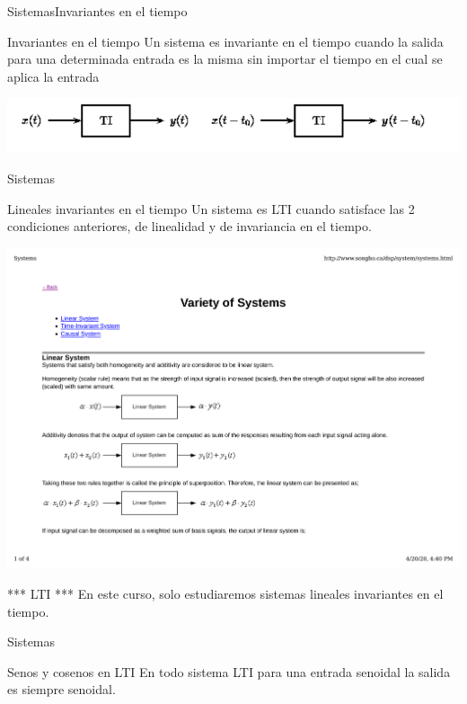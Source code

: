  \begin{frame}{Sistemas}{Invariantes en el tiempo}
    \begin{block}{Invariantes en el tiempo}
       Un sistema es invariante en el tiempo cuando la salida para una determinada entrada es la misma sin importar el tiempo en el cual se aplica la entrada
    \end{block}
    \center\includegraphics[width=1\textwidth]{1_clase/invariante_en_tiempo} \\
    \vfill
 \end{frame}
 \begin{frame}{Sistemas}{}
    \begin{block}{Lineales invariantes en el tiempo}
       Un sistema es LTI cuando satisface las 2 condiciones anteriores, de linealidad y de invariancia en el tiempo.
    \end{block}
    \center\includegraphics[width=1\textwidth]{1_clase/lti}
    \vfill
    \begin{alertblock}{*** LTI ***}
       En este curso, \alert{solo} estudiaremos sistemas lineales invariantes en el tiempo.
    \end{alertblock}
 \end{frame}
 \begin{frame}{Sistemas}{}
    \begin{block}{Senos y cosenos en LTI}
       En todo sistema LTI para una entrada senoidal la salida es siempre senoidal.
    \end{block}
    \vfill
 \end{frame}
